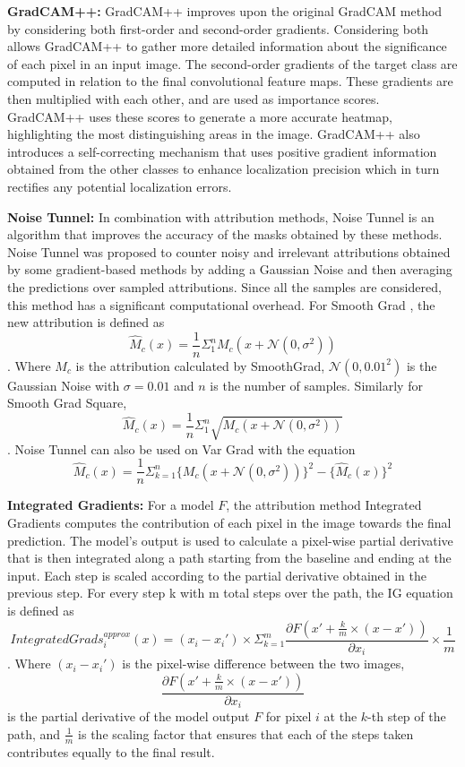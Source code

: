 \documentclass[a4paper,11pt,openright]{book}
\begin{document}
\textbf{GradCAM++: } GradCAM++ \cite{chattopadhayGradCAMGeneralizedGradientBased2018} improves upon the original GradCAM method by considering both first-order and second-order gradients. Considering both allows GradCAM++ to gather more detailed information about the significance of each pixel in an input image. The second-order gradients of the target class are computed in relation to the final convolutional feature maps. These gradients are then multiplied with each other, and are used as importance scores. GradCAM++ uses these scores to generate a more accurate heatmap, highlighting the most distinguishing areas in the image. GradCAM++ also introduces a self-correcting mechanism that uses positive gradient information obtained from the other classes to enhance localization precision which in turn rectifies any potential localization errors.

\textbf{Noise Tunnel: }
In combination with attribution methods, Noise Tunnel \cite{kokhlikyanCaptumUnifiedGeneric2020} is an algorithm that improves the accuracy of the masks obtained by these methods. Noise Tunnel was proposed to counter noisy and irrelevant attributions obtained by some gradient-based methods by adding a Gaussian Noise and then averaging the predictions over sampled attributions. Since all the samples are considered, this method has a significant computational overhead. For Smooth Grad \cite{smilkovSmoothGradRemovingNoise2017}, the new attribution is defined as $$\hat M_{c}(x) = \frac{1}{n}\Sigma_{1}^{n}M_{c}(x + \mathcal{N}(0, \sigma^{2}))$$. Where $M_{c}$ is the attribution calculated by SmoothGrad, $\mathcal {N}(0, 0.01^2)$ is the Gaussian Noise with $\sigma = 0.01$ and $n$ is the number of samples. Similarly for Smooth Grad Square, $$\hat M_{c}(x) = \frac{1}{n}\Sigma_{1}^{n}\sqrt{M_{c}(x + \mathcal{N}(0, \sigma^{2}))}$$. Noise Tunnel can also be used on Var Grad \cite{richterVarGradLowVarianceGradient2020} with the equation $$\hat M_{c}(x) = \frac{1}{n}\Sigma_{k=1}^{n}\{M_{c}(x + \mathcal{N}(0, \sigma^{2}))\}^{2}- \{\hat M_{c}(x)\}^{2}$$

\textbf{Integrated Gradients: }
For a model $F$, the attribution method Integrated Gradients \cite{sundararajanAxiomaticAttributionDeep2017} computes the contribution of each pixel in the image towards the final prediction. The model's output is used to calculate a pixel-wise partial derivative that is then integrated along a path starting from the baseline and ending at the input. Each step is scaled according to the partial derivative obtained in the previous step. For every step k with m total steps over the path, the IG equation is defined as $$IntegratedGrads_i^{approx}(x) =(x_{i}-x_i')\times \Sigma_{k=1}^{m}\frac{\partial F(x' + \frac{k}{m} \times (x-x'))}{\partial x_{i}} \times \frac{1}{m}$$. Where $(x_{i} - x_{i}')$ is the pixel-wise difference between the two images, $$\frac{\partial F(x' + \frac{k}{m} \times (x-x'))}{\partial x_i}$$ is the partial derivative of the model output $F$ for pixel $i$ at the $k$-th step of the path, and $\frac{1}{m}$ is the scaling factor that ensures that each of the steps taken contributes equally to the final result.
\end{document}
